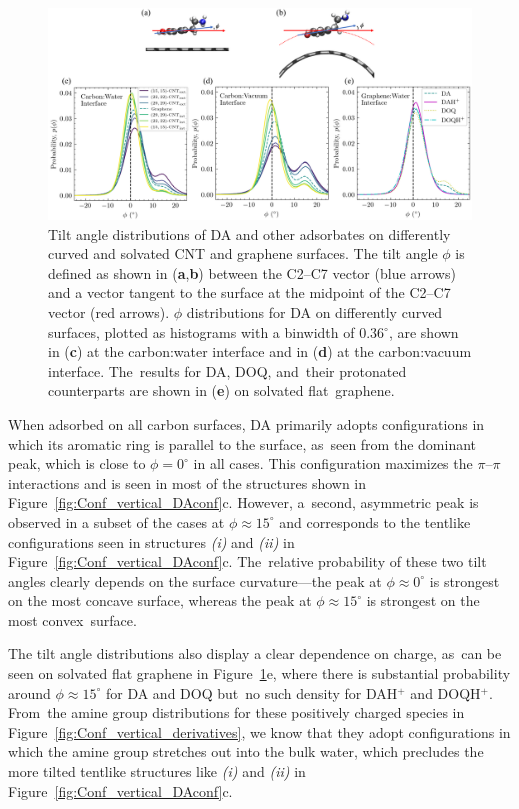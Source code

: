 \documentclass[molecules,article,accept,pdftex,moreauthors]{Definitions/mdpi}
\begin{document}
\begin{figure}[H]
    \includegraphics[width=\textwidth]{Figures/phi_output.png}
    \caption{Tilt angle distributions of DA and other adsorbates on differently curved and solvated CNT and graphene surfaces. The tilt angle $\phi$ is defined as shown in (\textbf{a},\textbf{b}) between the C2--C7 vector (blue arrows) and a vector tangent to the surface at the midpoint of the C2--C7 vector (red arrows). $\phi$ distributions for DA on differently curved surfaces, plotted as histograms with a binwidth of 0.36$^\circ$, are shown in (\textbf{c}) at the carbon:water interface and in (\textbf{d}) at the carbon:vacuum interface. The~results for DA, DOQ, and~their protonated counterparts are shown in (\textbf{e}) on solvated flat~graphene. }
    \label{fig:Conf_DA_tilt}
\end{figure}
    
When adsorbed on all carbon surfaces, DA primarily adopts configurations in which its aromatic ring is parallel to the surface, as~seen from the dominant peak, which is close to $\phi=0^{\circ}$ in all cases. This configuration maximizes the $\pi$--$\pi$ interactions and is seen in most of the structures shown in Figure~\ref{fig:Conf_vertical_DAconf}c. However, a~second, asymmetric peak is observed in a subset of the cases at $\phi\approx 15^{\circ}$ and corresponds to the tentlike configurations seen in structures \textit{(i)} and \textit{(ii)} in Figure~\ref{fig:Conf_vertical_DAconf}c. The~relative probability of these two tilt angles clearly depends on the surface curvature---the peak at $\phi\approx 0^{\circ}$ is strongest on the most concave surface, whereas the peak at $\phi\approx 15^{\circ}$ is strongest on the most convex~surface.

The tilt angle distributions also display a clear dependence on charge, as~can be seen on solvated flat graphene in Figure~\ref{fig:Conf_DA_tilt}e, where there is substantial probability around $\phi\approx 15^{\circ}$ for DA and DOQ but~no such density for DAH$^+$ and DOQH$^+$. From~the amine group distributions for these positively charged species in Figure~\ref{fig:Conf_vertical_derivatives}, we know that they adopt configurations in which the amine group stretches out into the bulk water, which precludes the more tilted tentlike structures like \textit{(i)} and \textit{(ii)} in Figure~\ref{fig:Conf_vertical_DAconf}c.
    
\end{document}

